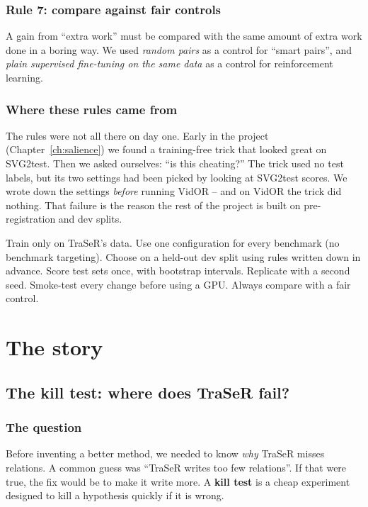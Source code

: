 \documentclass[11pt,openany]{book}
\newcommand{\qsec}{\section*{The question}}
\begin{document}
\section{Rule 7: compare against fair controls}
A gain from ``extra work'' must be compared with the same amount of extra work done in a boring way. We used \emph{random pairs}
as a control for ``smart pairs'', and \emph{plain supervised fine-tuning on the same data} as a control for reinforcement learning.

\section*{Where these rules came from}
The rules were not all there on day one. Early in the project (Chapter~\ref{ch:salience}) we found a training-free trick that
looked great on SVG2test. Then we asked ourselves: ``is this cheating?'' The trick used no test labels, but its two settings had
been picked by looking at SVG2test scores. We wrote down the settings \emph{before} running VidOR -- and on VidOR the trick did
nothing. That failure is the reason the rest of the project is built on pre-registration and dev splits.

\begin{summarybox}
Train only on TraSeR's data. Use one configuration for every benchmark (no benchmark targeting). Choose on a held-out dev split
using rules written down in advance. Score test sets once, with bootstrap intervals. Replicate with a second seed. Smoke-test every
change before using a GPU. Always compare with a fair control.
\end{summarybox}


\part{The story}

\chapter{The kill test: where does TraSeR fail?}\label{ch:kill}

\qsec
Before inventing a better method, we needed to know \emph{why} TraSeR misses relations. A common guess was ``TraSeR writes too few
relations''. If that were true, the fix would be to make it write more. A \textbf{kill test} is a cheap experiment designed to
kill a hypothesis quickly if it is wrong.
\end{document}
